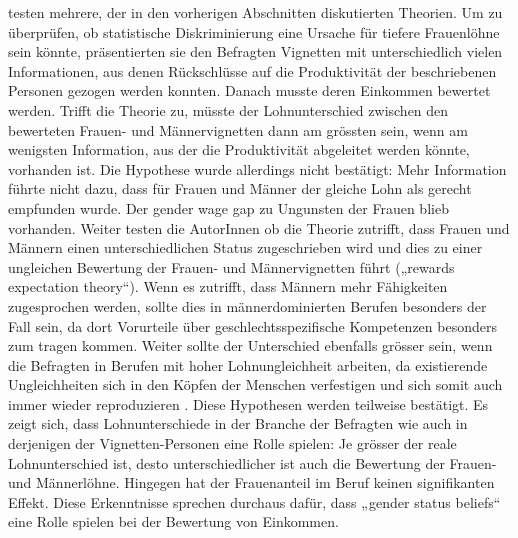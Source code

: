 \documentclass[a4paper,12pt]{article}
\begin{document}
\citet{Auspurg-etal-2017} testen mehrere, der in den vorherigen Abschnitten diskutierten Theorien. Um zu überprüfen, ob statistische Diskriminierung eine Ursache für tiefere Frauenlöhne sein könnte, präsentierten sie den Befragten Vignetten mit unterschiedlich vielen Informationen, aus denen Rückschlüsse auf die Produktivität der beschriebenen Personen gezogen werden konnten. Danach musste deren Einkommen bewertet werden. Trifft die Theorie zu, müsste der Lohnunterschied zwischen den bewerteten Frauen- und Männervignetten dann am grössten sein, wenn am wenigsten Information, aus der die Produktivität abgeleitet werden könnte, vorhanden ist. Die Hypothese wurde allerdings nicht bestätigt: Mehr Information führte nicht dazu, dass für Frauen und Männer der gleiche Lohn als gerecht empfunden wurde. Der gender wage gap zu Ungunsten der Frauen blieb vorhanden.
Weiter testen die AutorInnen ob die Theorie zutrifft, dass Frauen und Männern einen unterschiedlichen Status zugeschrieben wird und dies zu einer ungleichen Bewertung der Frauen- und Männervignetten führt („rewards expectation theory“). Wenn es zutrifft, dass Männern mehr Fähigkeiten zugesprochen werden, sollte dies in männerdominierten Berufen besonders der Fall sein, da dort Vorurteile über geschlechtsspezifische Kompetenzen besonders zum tragen kommen. Weiter sollte der Unterschied ebenfalls grösser sein, wenn die Befragten in Berufen mit hoher Lohnungleichheit arbeiten, da existierende Ungleichheiten sich in den Köpfen der Menschen verfestigen und sich somit auch immer wieder reproduzieren \citep[182]{Auspurg-etal-2017}. Diese Hypothesen werden teilweise bestätigt. Es zeigt sich, dass Lohnunterschiede in der Branche der Befragten wie auch in derjenigen der Vignetten-Personen eine Rolle spielen: Je grösser der reale Lohnunterschied ist, desto unterschiedlicher ist auch die Bewertung der Frauen- und Männerlöhne. Hingegen hat der Frauenanteil im Beruf keinen signifikanten Effekt. Diese Erkenntnisse sprechen durchaus dafür, dass „gender status beliefs“ eine Rolle spielen bei der Bewertung von Einkommen.
\end{document}
